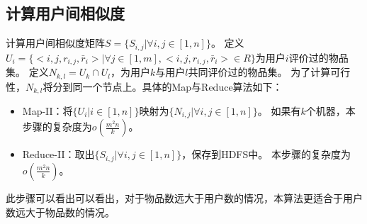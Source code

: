 \subsection{计算用户间相似度}
计算用户间相似度矩阵$S=\{S_{i,j}|\forall i,j\in[1,n]\}$。
定义$U_i = \{<i,j,r_{i,j},\bar{r}_i>|\forall j \in [1,m],<i,j,r_{i,j},\bar{r}_i>\in R\}$为用户$i$评价过的物品集。
定义$N_{k,l} = U_k \cap U_l$，为用户$k$与用户$l$共同评价过的物品集。
为了计算可行性，$N_{k,l}$将分到同一个节点上。具体的Map与Reduce算法如下：
\begin{itemize}
\item Map-II：将$\{U_i|i\in [1,n]\}$映射为$\{N_{i,j}|\forall i,j\in [1,n]\}$。
如果有$k$个机器，本步骤的复杂度为$o(\frac{m^2n}{k})$。
\item Reduce-II：取出$\{S_{i,j}|\forall i,j\in [1,n]\}$，保存到HDFS中。
本步骤的复杂度为$o(\frac{m^2n}{k})$。
\end{itemize}
此步骤可以看出可以看出，对于物品数远大于用户数的情况，本算法更适合于用户数远大于物品数的情况。

